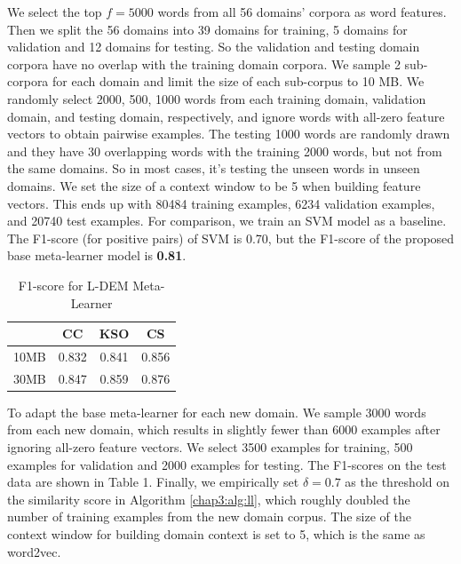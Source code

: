We select the top $f=5000$ words from all 56 domains' corpora as word features.
Then we split the 56 domains into 39 domains for training, 5 domains for validation and 12 domains for testing.
So the validation and testing domain corpora have no overlap with the training domain corpora.
We sample 2 sub-corpora for each domain and limit the size of each sub-corpus to 10 MB. We randomly select 2000, 500, 1000 words from each training domain, validation domain, and testing domain, respectively, and ignore words with all-zero feature vectors to obtain pairwise examples. 
The testing 1000 words are randomly drawn and they have 30 overlapping words with the training 2000 words, but not from the same domains. So in most cases, it's testing the unseen words in unseen domains.
We set the size of a context window to be 5 when building feature vectors.
This ends up with 80484 training examples, 6234 validation examples, and 20740 test examples.
For comparison, we train an SVM model as a baseline.
The F1-score (for positive pairs) of SVM is 0.70, but the F1-score of the proposed base meta-learner model is \textbf{0.81}.

\begin{table}
\begin{center}

\begin{tabular}{l || c | c | c }
\hline
 & CC & KSO & CS\\
\hline
\hline
10MB & 0.832 & 0.841 & 0.856 \\
30MB & 0.847 & 0.859 & 0.876 \\
\hline

\end{tabular}
\caption{F1-score for L-DEM Meta-Learner}
\end{center}
\label{chap3:table:fine-tune}
\end{table}

To adapt the base meta-learner for each new domain. We sample 3000 words from each new domain, which results in slightly fewer than 6000 examples after ignoring all-zero feature vectors.
We select 3500 examples for training, 500 examples for validation and 2000 examples for testing.
The F1-scores on the test data are shown in Table 1.
Finally, we empirically set $\delta=0.7$ as the threshold on the similarity score in Algorithm \ref{chap3:alg:ll}, which roughly doubled the number of training examples from the new domain corpus. 
The size of the context window for building domain context is set to 5, which is the same as word2vec.

